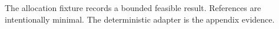 \documentclass[a4paper]{article}
\begin{document}
\label{mm:body-start}The allocation fixture records a bounded feasible result.\label{mm:body-end}
\clearpage\label{mm:references-start}References are intentionally minimal.\label{mm:references-end}
\clearpage\label{mm:appendix-start}The deterministic adapter is the appendix evidence.\label{mm:appendix-end}
\end{document}
